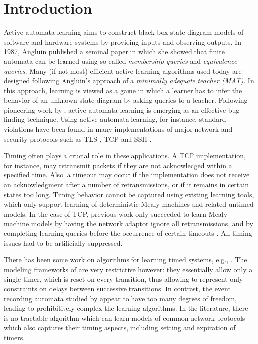 \section{Introduction}
\label{sec:intro}

Active automata learning aims to construct black-box state diagram models of software and hardware systems
by providing inputs and observing outputs.
In 1987, Angluin \cite{Ang87} published a seminal paper in which she showed that finite automata can be learned using so-called 
\emph{membership queries} and \emph{equivalence queries}.
Many (if not most) efficient active learning algorithms used
today are designed following Angluin's approach of a \emph{minimally adequate teacher (MAT)}.
In this approach, learning is viewed as a game in which a learner has to infer the behavior of
an unknown state diagram by asking queries to a teacher.
Following pioneering work by \cite{Ang87,PeVaYa02,Hagerer2002,RaMeSM2009,IsHoSt2015},
active automata learning is emerging as an effective bug finding technique.
Using active automata learning, for instance, standard violations have been found in many implementations of
major network and security protocols such as TLS \cite{dRP15}, TCP \cite{FJV16,FH17} and SSH \cite{FiterauEtAl17}.

Timing often plays a crucial role in these applications.
A TCP implementation, for instance, may retransmit packets if they are not acknowledged within
a specified time. Also, a timeout may occur if the implementation does not receive an acknowledgment
after a number of retransmissions, or if it remains in certain states too long.
Timing behavior cannot be captured using existing learning tools, which only support learning of deterministic
Mealy machines and related untimed models.
In the case of TCP, previous work only succeeded to learn Mealy machine models by having the network adaptor 
ignore all retransmissions, and by completing learning queries before the occurrence of certain timeouts \cite{FJV16}.
All timing issues had to be artificially suppressed.

There has been some work on algorithms for learning timed systems, e.g., \cite{GrinchteinJP06,GrinchteinJL10,CCF16,VWW:rti}.
The modeling frameworks of \cite{VWW:rti,CCF16} are very restrictive however: they essentially allow only a single timer, which is reset on every transition,
thus allowing to represent only constraints on delays between successive transitions. In contrast, the event recording automata studied by \cite{GrinchteinJP06,GrinchteinJL10} appear to have too many degrees of freedom, leading to
prohibitively complex the learning algorithms.
In the literature, there is no tractable algorithm which can learn models of
common network protocols which also captures their timing aspects, including
setting and expiration of timers.

